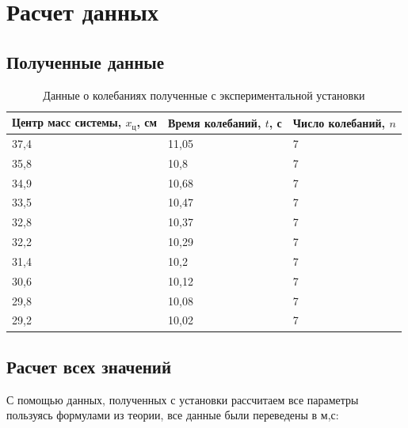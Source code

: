 \documentclass[a4paper]{article}
\begin{document}
\section{Расчет данных}
\subsection{Полученные данные}
\begin{table}[!h]
\begin{center}
\begin{tabular}{|l|l|l|}
\hline
Центр масс   системы, $x_{\text{ц}}$, см & Время колебаний, $t$, с & Число колебаний,  $n$ \\ \hline
37,4                                      & 11,05                 & 7                     \\ \hline
35,8                                      & 10,8                  & 7                     \\ \hline
34,9                                      & 10,68                 & 7                     \\ \hline
33,5                                      & 10,47                 & 7                     \\ \hline
32,8                                      & 10,37                 & 7                     \\ \hline
32,2                                      & 10,29                 & 7                     \\ \hline
31,4                                      & 10,2                  & 7                     \\ \hline
30,6                                      & 10,12                 & 7                     \\ \hline
29,8                                      & 10,08                 & 7                     \\ \hline
29,2                                      & 10,02                 & 7                     \\ \hline
\end{tabular}
\caption{Данные о колебаниях полученные с экспериментальной установки}
\end{center}
\end{table}
\subsection{Расчет всех значений}
С помощью данных, полученных с установки рассчитаем все параметры пользуясь формулами из теории, все данные были переведены в м,с:
\end{document}
